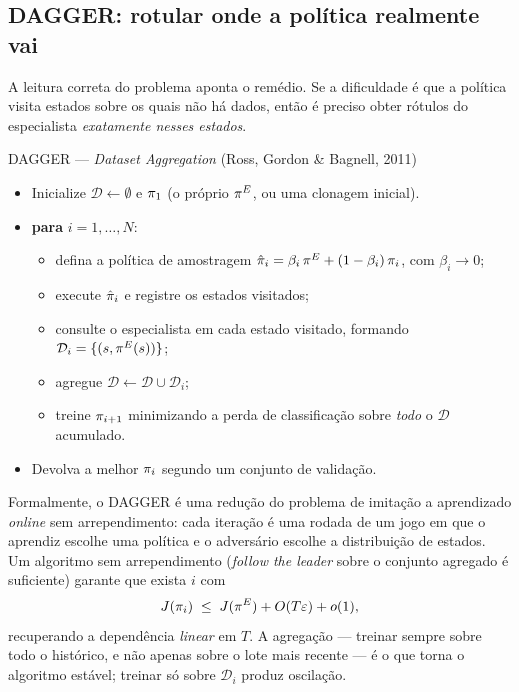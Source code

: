 \documentclass[11pt, a4paper]{article}
\newcommand{\polE}{\pol^{E}}
\newcommand{\Dset}{\mathcal{D}}
\begin{document}
\subsection{DAGGER: rotular onde a política realmente vai}

A leitura correta do problema aponta o remédio. Se a dificuldade é que a política
visita estados sobre os quais não há dados, então é preciso obter rótulos do
especialista \emph{exatamente nesses estados}.

\begin{algbox}{DAGGER --- \emph{Dataset Aggregation} (Ross, Gordon \& Bagnell, 2011)}
\begin{itemize}
  \item Inicialize $\Dset \leftarrow \emptyset$ e $\pi_1$ (o próprio $\polE$, ou
    uma clonagem inicial).
  \item \textbf{para} $i = 1,\dots,N$:
    \begin{itemize}
      \item defina a política de amostragem
        $\hat\pol_i = \beta_i\,\polE + (1-\beta_i)\,\pol_i$, com $\beta_i \to 0$;
      \item execute $\hat{\pi}_i$ e registre os estados visitados;
      \item consulte o especialista em cada estado visitado, formando
        $\Dset_i = \{(s, \polE(s))\}$;
      \item agregue $\Dset \leftarrow \Dset \cup \Dset_i$;
      \item treine $\pi_{i+1}$ minimizando a perda de classificação sobre
        \emph{todo} o $\Dset$ acumulado.
    \end{itemize}
  \item Devolva a melhor $\pi_i$ segundo um conjunto de validação.
\end{itemize}
\end{algbox}

Formalmente, o DAGGER é uma redução do problema de imitação a aprendizado
\emph{online} sem arrependimento: cada iteração é uma rodada de um jogo em que o
aprendiz escolhe uma política e o adversário escolhe a distribuição de estados.
Um algoritmo sem arrependimento (\emph{follow the leader} sobre o conjunto
agregado é suficiente) garante que exista $i$ com
\[
  J(\pol_i) \;\le\; J(\polE) + O(T\varepsilon) + o(1),
\]
recuperando a dependência \emph{linear} em $T$. A agregação --- treinar sempre
sobre todo o histórico, e não apenas sobre o lote mais recente --- é o que torna
o algoritmo estável; treinar só sobre $\Dset_i$ produz oscilação.
\end{document}
